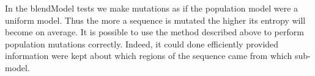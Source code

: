\documentclass[letterpaper,11pt,oneside]{article}
\begin{document}
In the blendModel tests we make mutations as if the population model were a
uniform model.  Thus the more a sequence is mutated the higher its entropy
will become on average.  It is possible to use the method described above to
perform population mutations correctly.  Indeed, it could done efficiently
provided information were kept about which regions of the sequence came from
which sub-model.


\end{document}
